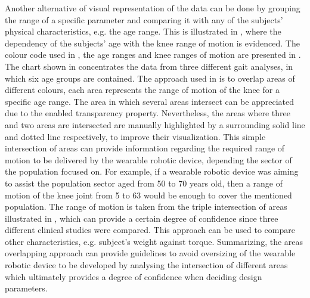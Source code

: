 Another alternative of visual representation of the data can be done by grouping the range of a specific parameter and comparing it with any of the subjects' physical characteristics, e.g. the age range. This is illustrated in , where the dependency of the subjects' age with the knee range of motion is evidenced. The colour code used in , the age ranges and knee ranges of motion are presented in . The chart shown in  concentrates the data from three different gait analyses, in which six age groups are contained. The approach used in  is to overlap areas of different colours, each area represents the range of motion of the knee for a specific age range. The area in which several areas intersect can be appreciated due to the enabled transparency property. Nevertheless, the areas where three and two areas are intersected are manually highlighted by a surrounding solid line and dotted line respectively, to improve their visualization. This simple intersection of areas can provide information regarding the required range of motion to be delivered by the wearable robotic device, depending the sector of the population focused on.
For example, if a wearable robotic device was aiming to assist the population sector aged from 50 to 70 years old, then a range of motion of the knee joint from 5{\textdegree} to 63{\textdegree} would be enough to cover the mentioned population. The range of motion is taken from the triple intersection of areas illustrated in , which can provide a certain degree of confidence since three different clinical studies were compared. This approach can be used to compare other characteristics, e.g. subject's weight against torque. Summarizing, the areas overlapping approach can provide guidelines to avoid oversizing of the wearable robotic device to be developed by analysing the intersection of different areas which ultimately provides a degree of confidence when deciding design parameters.

